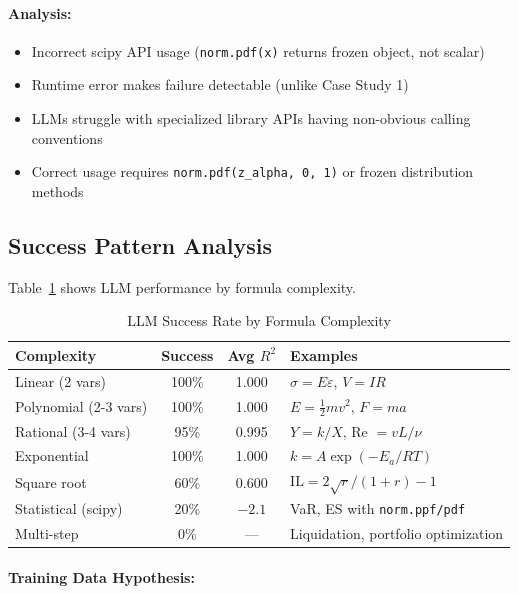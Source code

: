 \documentclass[twoside,11pt]{article}
\begin{document}
\paragraph{Analysis:}
\begin{itemize}
\item Incorrect scipy API usage (\texttt{norm.pdf(x)} returns frozen object, not scalar)
\item Runtime error makes failure detectable (unlike Case Study 1)
\item LLMs struggle with specialized library APIs having non-obvious calling conventions\citep{kambhampati2024llms}
\item Correct usage requires \texttt{norm.pdf(z\_alpha, 0, 1)} or frozen distribution methods
\end{itemize}

\subsection{Success Pattern Analysis}

Table~\ref{tab:llm_success_patterns} shows LLM performance by formula complexity\citep{kambhampati2024llms}.

\begin{table}[htbp]
\centering
\caption{LLM Success Rate by Formula Complexity}
\label{tab:llm_success_patterns}
\begin{tabular}{@{}lccp{5cm}@{}}
\toprule
\textbf{Complexity} & \textbf{Success} & \textbf{Avg $R^2$} & \textbf{Examples} \\
\midrule
Linear (2 vars) & 100\% & 1.000 & $\sigma = E\varepsilon$, $V = IR$ \\
Polynomial (2-3 vars) & 100\% & 1.000 & $E = \frac{1}{2}mv^2$, $F = ma$ \\
Rational (3-4 vars) & 95\% & 0.995 & $Y = k/X$, Re $= vL/\nu$ \\
Exponential & 100\% & 1.000 & $k = A \exp(-E_a/RT)$ \\
Square root & 60\% & 0.600 & $\text{IL} = 2\sqrt{r}/(1+r) - 1$ \\
Statistical (scipy) & 20\% & $-2.1$ & VaR, ES with \texttt{norm.ppf/pdf} \\
Multi-step & 0\% & --- & Liquidation, portfolio optimization \\
\bottomrule
\end{tabular}
\end{table}

\paragraph{Training Data Hypothesis:}
\end{document}
